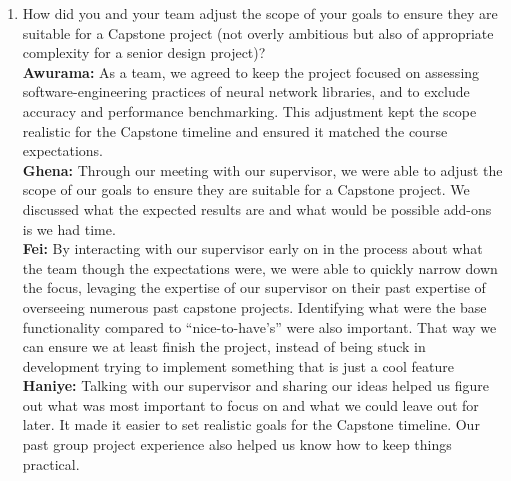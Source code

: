 \documentclass{article}
\begin{document}
\begin{enumerate}
    \item How did you and your team adjust the scope of your goals to ensure
    they are suitable for a Capstone project (not overly ambitious but also of
    appropriate complexity for a senior design project)? \\
    \textbf{Awurama:} As a team, we agreed to keep the project focused on assessing software-engineering practices of neural network libraries, and to exclude accuracy and performance benchmarking. This adjustment kept the scope realistic for the Capstone timeline and ensured it matched the course expectations.
    \\\textbf{Ghena:} Through our meeting with our supervisor, we were able to adjust the scope of our goals to ensure they are suitable for a Capstone project. We discussed what the expected results are and what would be possible add-ons is we had time.
    \\\textbf{Fei:} By interacting with our supervisor early on in the process about what the team though the expectations were, we were able to quickly narrow down the focus, levaging the expertise of our supervisor on their past expertise of overseeing numerous past capstone projects. Identifying what were the base functionality compared to “nice-to-have’s” were also important. That way we can ensure we at least finish the project, instead of being stuck in development trying to implement something that is just a cool feature
    \\\textbf{Haniye:} Talking with our supervisor and sharing our ideas helped us figure out what was most important to focus on and what we could leave out for later. It made it easier to set realistic goals for the Capstone timeline. Our past group project experience also helped us know how to keep things practical.

\end{enumerate}
\end{document}
